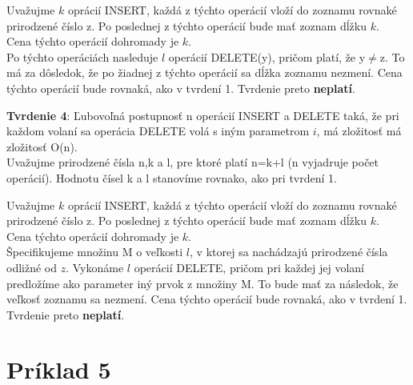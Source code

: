 \documentclass[paper=a4, fontsize=11pt]{scrartcl} %
\numberwithin{equation}{section} %
\numberwithin{figure}{section} %
\numberwithin{table}{section} %
\begin{document}
Uvažujme $k$ oprácií INSERT, každá z týchto operácií vloží do zoznamu rovnaké prirodzené číslo z.
Po poslednej z týchto operácií bude mať zoznam dĺžku $k$. \\

Cena týchto operácií dohromady je $k$. \\

Po týchto operáciách nasleduje $l$ operácií DELETE(y), pričom platí, že y$\neq$z. To má za dôsledok, že po žiadnej z týchto operácií sa dĺžka zoznamu nezmení. Cena týchto operácií bude rovnaká, ako v tvrdení 1.
Tvrdenie preto \textbf{neplatí}.

\textbf{Tvrdenie 4}: Ľubovoľná postupnosť n operácií INSERT a DELETE taká, že pri každom volaní sa operácia DELETE volá s iným parametrom $i$, má zložitosť má zložitosť O(n). \\

Uvažujme prirodzené čísla n,k a l, pre ktoré platí n=k+l (n vyjadruje počet operácií).
Hodnotu čísel k a l stanovíme rovnako, ako pri tvrdení 1.

Uvažujme $k$ oprácií INSERT, každá z týchto operácií vloží do zoznamu rovnaké prirodzené číslo z.
Po poslednej z týchto operácií bude mať zoznam dĺžku $k$. \\

Cena týchto operácií dohromady je $k$. \\

Špecifikujeme množinu M o veľkosti $l$, v ktorej sa nachádzajú prirodzené čísla odližné od $z$.
Vykonáme $l$ operácií DELETE, pričom pri každej jej volaní predložíme ako parameter iný prvok z množiny M.
To bude mať za následok, že veľkosť zoznamu sa nezmení. Cena týchto operácií bude rovnaká, ako v tvrdení 1.
Tvrdenie preto \textbf{neplatí}.





\pagebreak

\section*{Príklad 5}
\end{document}
